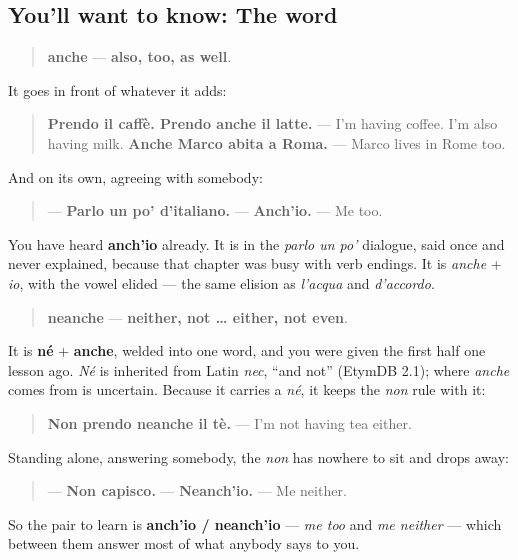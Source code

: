 \subsection*{You'll want to know: The word}
\begin{quote}
\textbf{anche} — \textbf{also, too, as well}.
\end{quote}

It goes in front of whatever it adds:

\begin{quote}
\textbf{Prendo il caffè. Prendo anche il latte.} — I'm having coffee. I'm also having milk. \textbf{Anche Marco abita a Roma.} — Marco lives in Rome too.
\end{quote}

And on its own, agreeing with somebody:

\begin{quote}
— \textbf{Parlo un po' d'italiano.} — \textbf{Anch'io.} — Me too.
\end{quote}

You have heard \textbf{anch'io} already. It is in the \emph{parlo un po'} dialogue, said once and never explained, because that chapter was busy with verb endings. It is \emph{anche} + \emph{io}, with the vowel elided — the same elision as \emph{l'acqua} and \emph{d'accordo}.

\begin{cousinweb}
\begin{quote}
\textbf{neanche} — \textbf{neither, not … either, not even}.
\end{quote}

It is \textbf{né} + \textbf{anche}, welded into one word, and you were given the first half one lesson ago. \emph{Né} is inherited from Latin \emph{nec}, \textquotedblleft{}and not\textquotedblright{} (EtymDB 2.1); where \emph{anche} comes from is uncertain. Because it carries a \emph{né}, it keeps the \emph{non} rule with it:

\begin{quote}
\textbf{Non prendo neanche il tè.} — I'm not having tea either.
\end{quote}

Standing alone, answering somebody, the \emph{non} has nowhere to sit and drops away:

\begin{quote}
— \textbf{Non capisco.} — \textbf{Neanch'io.} — Me neither.
\end{quote}

So the pair to learn is \textbf{anch'io / neanch'io} — \emph{me too} and \emph{me neither} — which between them answer most of what anybody says to you.
\end{cousinweb}

